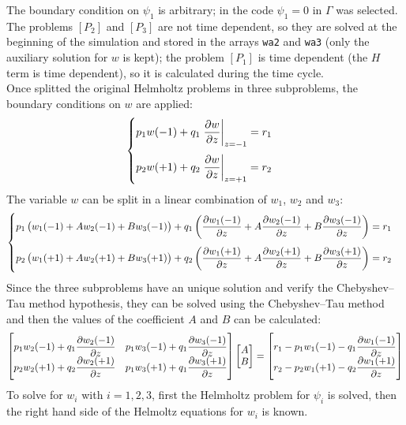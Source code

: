 The boundary condition on $\psi_1$ is arbitrary; in the code $\psi_1=0$ in $\Gamma$ was selected. The problems $[P_2]$ and $[P_3]$ are not time dependent, so they are solved at the beginning of the simulation and stored in the arrays \texttt{wa2} and \texttt{wa3} (only the auxiliary solution for $w$ is kept); the problem $[P_1]$ is time dependent (the $H$ term is time dependent), so it is calculated during the time cycle.\\
Once splitted the original Helmholtz problems in three subproblems, the boundary conditions on $w$ are applied:
\[
\begin{cases}
p_1w(-1)+q_1\left.\dfrac{\partial w}{\partial z}\right|_{z=-1}=r_1\\[3ex]
p_2w(+1)+q_2\left.\dfrac{\partial w}{\partial z}\right|_{z=+1}=r_2
\end{cases}
\]
The variable $w$ can be split in a linear combination of $w_1$, $w_2$ and $w_3$:
\[
\begin{cases}
p_1\left(w_1(-1)+Aw_2(-1)+Bw_3(-1)\right)+q_1\left(\dfrac{\partial w_1(-1)}{\partial z}+A\dfrac{\partial w_2(-1)}{\partial z}+B\dfrac{\partial w_3(-1)}{\partial z}\right)=r_1\\[3ex]
p_2\left(w_1(+1)+Aw_2(+1)+Bw_3(+1)\right)+q_2\left(\dfrac{\partial w_1(+1)}{\partial z}+A\dfrac{\partial w_2(+1)}{\partial z}+B\dfrac{\partial w_3(+1)}{\partial z}\right)=r_2
\end{cases}
\]
Since the three subproblems have an unique solution and verify the Chebyshev--Tau method hypothesis, they can be solved using the Chebyshev--Tau method and then the values of the coefficient $A$ and $B$ can be calculated:
\[
\begin{bmatrix}
p_1w_2(-1)+q_1\dfrac{\partial w_2(-1)}{\partial z} & p_1w_3(-1)+q_1\dfrac{\partial w_3(-1)}{\partial z} \\
p_2w_2(+1)+q_2\dfrac{\partial w_2(+1)}{\partial z} & p_1w_3(+1)+q_1\dfrac{\partial w_3(+1)}{\partial z} \\
\end{bmatrix}
\begin{bmatrix}
A\\
B\\
\end{bmatrix}
=
\begin{bmatrix}
r_1-p_1w_1(-1)-q_1\dfrac{\partial w_1(-1)}{\partial z}\\
r_2-p_2w_1(+1)-q_2\dfrac{\partial w_1(+1)}{\partial z}\\
\end{bmatrix}
\]
To solve for $w_i$ with $i=1,2,3$, first the Helmholtz problem for $\psi_i$ is solved, then the right hand side of the Helmoltz equations for $w_i$ is known.\\
